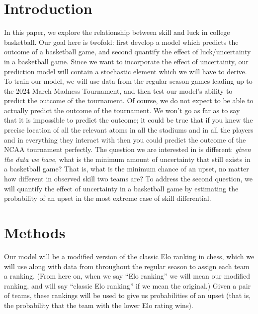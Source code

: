 \documentclass{article}
\begin{document}
\section{Introduction}
In this paper, we explore the relationship between skill and luck in college basketball. Our goal here is twofold: first develop a model which predicts the outcome of a basketball game, and second quantify the effect of luck/uncertainty in a basketball game. Since we want to incorporate the effect of uncertainty, our prediction model will contain a stochastic element which we will have to derive. To train our model, we will use data from the regular season games leading up to the 2024 March Madness Tournament, and then test our model's ability to predict the outcome of the tournament. Of course, we do not expect to be able to actually predict the outcome of the tournament. We won't go as far as to say that it is impossible to predict the outcome; it could be true that if you knew the precise location of all the relevant atoms in all the stadiums and in all the players and in everything they interact with then you could predict the outcome of the NCAA tournament perfectly. The question we are interested in is different: \textit{given the data we have}, what is the minimum amount of uncertainty that still exists in a basketball game? That is, what is the minimum chance of an upset, no matter how different in observed skill two teams are? To address the second question, we will quantify the effect of uncertainty in a basketball game by estimating the probability of an upset in the most extreme case of skill differential. 

\section{Methods}

Our model will be a modified version of the classic Elo ranking in chess, which we will use along with data from throughout the regular season to assign each team a ranking. (From here on, when we say ``Elo ranking'' we will mean our modified ranking, and will say ``classic Elo ranking'' if we mean the original.) Given a pair of teams, these rankings will be used to give us probabilities of an upset (that is, the probability that the team with the lower Elo rating wins). 
\end{document}
